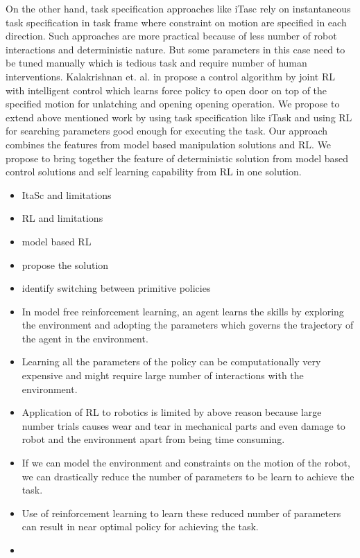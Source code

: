 \documentclass[thesis]{mas_proposal}
\begin{document}
On the other hand, task specification approaches like iTasc rely on instantaneous task specification in task frame where constraint on motion are specified in each direction. Such approaches are more practical because of less number of robot interactions and deterministic nature. But some parameters in this case need to be tuned manually which is tedious task and require number of human interventions. 
Kalakrishnan et. al. in \cite{kalakrishnan2011learning} propose a control algorithm by joint RL with intelligent control which learns force policy to open door on top of the specified motion for unlatching and opening opening operation.
We propose to extend above mentioned work by using task specification like iTask and using RL for searching parameters good enough for executing the task. Our approach combines the features from model based manipulation solutions and RL. We propose to bring together the feature of deterministic solution from model based control solutions and self learning capability from RL in one solution.  
\begin{itemize}
	\item ItaSc and limitations
	\item RL and limitations
	\item model based RL
	\item propose the solution
	\item identify switching between primitive policies  
\end{itemize}
\begin{itemize}
	\item In model free reinforcement learning, an agent learns the skills by exploring the environment and adopting the parameters which governs the trajectory of the agent in the environment.
	\item Learning all the parameters of the policy can be computationally very expensive and might require large number of interactions with the environment.
	\item Application of RL to robotics is limited by above reason because large number trials causes wear and tear in mechanical parts and even damage to robot and the environment apart from being time consuming. 
	\item If we can model the environment and constraints on the motion of the robot, we can drastically reduce the number of parameters to be learn to achieve the task.
	\item Use of reinforcement learning to learn these reduced number of parameters can result in near optimal policy for achieving the task.
	\item 
\end{itemize}
\end{document}
